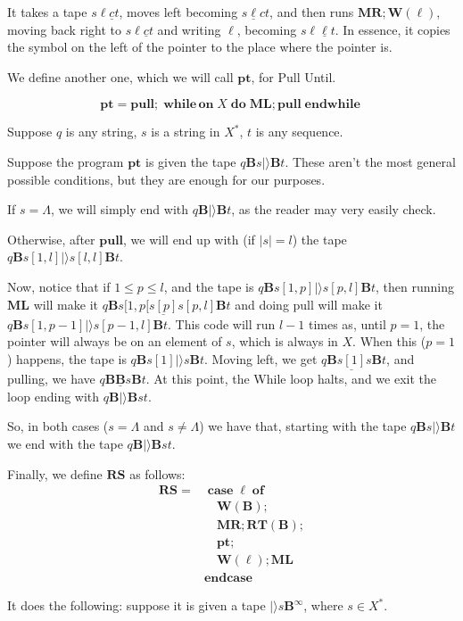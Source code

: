 \documentclass{article}
\newcommand{\B}{\mathbf{B}}
\DeclareMathOperator{\Nwhileon}{\mathbf{while\,on}}
\DeclareMathOperator{\Ndo}{\mathbf{do}}
\DeclareMathOperator{\Nendwhile}{\mathbf{endwhile}}
\DeclareMathOperator{\Ncase}{\mathbf{case}}
\DeclareMathOperator{\Nof}{\mathbf{of}}
\DeclareMathOperator{\Nendcase}{\mathbf{endcase}}
\newcommand{\MR}{\mathbf{MR}}
\newcommand{\ML}{\mathbf{ML}}
\newcommand{\W}{\mathbf{W}}
\newcommand{\RT}{\mathbf{RT}}
\newcommand{\pull}{\mathbf{pull}}
\newcommand{\pt}{\mathbf{pt}}
\newcommand{\RS}{\mathbf{RS}}
\begin{document}
	It takes a tape $s \ell \underline c t$, moves left becoming $s \underline \ell c t$, and then runs $\MR; \W(\ell)$, moving back right to $s \ell \underline c t$ and writing $\ell$, becoming $s \ell \underline \ell t$. In essence, it copies the symbol on the left of the pointer to the place where the pointer is.
	
	We define another one, which we will call $\pt$, for Pull Until.
	
	\[\pt = \pull; \Nwhileon X \Ndo \ML; \pull \Nendwhile\]
	
	Suppose $q$ is any string, $s$ is a string in $X^*$, $t$ is any sequence.
	
	Suppose the program $\pt$ is given the tape $q \B s |\rangle \B t$. These aren't the most general possible conditions, but they are enough for our purposes.
	
	If $s = \Lambda$, we will simply end with $q \B |\rangle \B t$, as the reader may very easily check.
	
	Otherwise, after $\pull$, we will end up with (if $\lvert s \rvert = l$) the tape $q \B s[1, l] |\rangle s[l,l] \B t$.
	
	Now, notice that if $1 \leq p \leq l$, and the tape is $q \B s[1, p] |\rangle s[p,l] \B t$, then running $\ML$ will make it $q \B s[1, p[ \underline{ s[p]} s[p,l] \B t$ and doing pull will make it $q \B s[1, p-1] |\rangle s[p-1, l] \B t$. This code will run $l-1$ times as, until $p = 1$, the pointer will always be on an element of $s$, which is always in $X$. When this ($p = 1$) happens, the tape is $q \B s[1] |\rangle s \B t$. Moving left, we get $q \B \underline{s[1]} s \B t$, and pulling, we have $q \B \underline{\B} s \B t$. At this point, the While loop halts, and we exit the loop ending with $q \B |\rangle \B s t$.
	
	So, in both cases ($s = \Lambda$ and $s \neq \Lambda$) we have that, starting with the tape $q \B s |\rangle \B t$ we end with the tape $q \B |\rangle \B s t$.
	
	Finally, we define $\RS$ as follows:
	\begin{align*}
	\RS =& \Ncase \ell \Nof\\
	&\quad \W(\B);\\
	&\quad \MR; \RT(\B);\\
	&\quad \pt; \\
	&\quad \W(\ell); \ML\\
	&\Nendcase
	\end{align*}
	
	It does the following: suppose it is given a tape $|\rangle s \B^\infty$, where $s \in X^*$.
	
\end{document}
